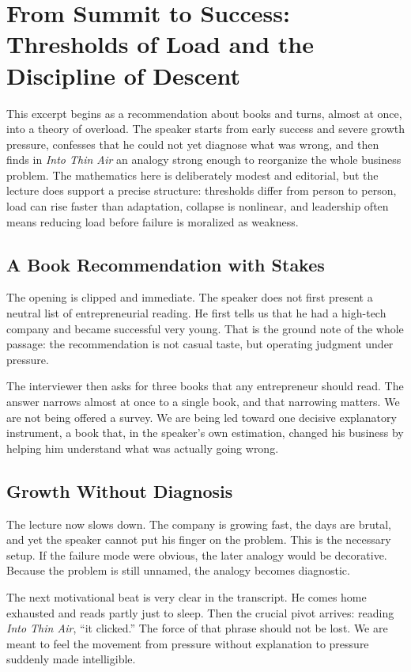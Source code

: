 \chapter{From Summit to Success: Thresholds of Load and the Discipline of Descent}

This excerpt begins as a recommendation about books and turns, almost at once, into a theory of overload. The speaker starts from early success and severe growth pressure, confesses that he could not yet diagnose what was wrong, and then finds in \emph{Into Thin Air} an analogy strong enough to reorganize the whole business problem. The mathematics here is deliberately modest and editorial, but the lecture does support a precise structure: thresholds differ from person to person, load can rise faster than adaptation, collapse is nonlinear, and leadership often means reducing load before failure is moralized as weakness.

\section{A Book Recommendation with Stakes}

The opening is clipped and immediate. The speaker does not first present a neutral list of entrepreneurial reading. He first tells us that he had a high-tech company and became successful very young. That is the ground note of the whole passage: the recommendation is not casual taste, but operating judgment under pressure.

The interviewer then asks for three books that any entrepreneur should read. The answer narrows almost at once to a single book, and that narrowing matters. We are not being offered a survey. We are being led toward one decisive explanatory instrument, a book that, in the speaker's own estimation, changed his business by helping him understand what was actually going wrong.

\section{Growth Without Diagnosis}

The lecture now slows down. The company is growing fast, the days are brutal, and yet the speaker cannot put his finger on the problem. This is the necessary setup. If the failure mode were obvious, the later analogy would be decorative. Because the problem is still unnamed, the analogy becomes diagnostic.

The next motivational beat is very clear in the transcript. He comes home exhausted and reads partly just to sleep. Then the crucial pivot arrives: reading \emph{Into Thin Air}, ``it clicked.'' The force of that phrase should not be lost. We are meant to feel the movement from pressure without explanation to pressure suddenly made intelligible.

